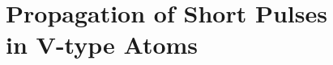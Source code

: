 \chapter[Propagation of Short Pulses in V-type Atoms]
  {Propagation of Short Pulses\\ in V-type Atoms}
  \label{chp:simultons}

  

  

  

  

  

  

  